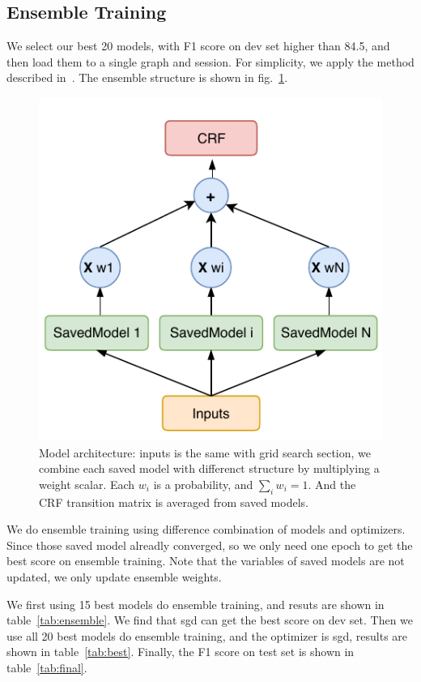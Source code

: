 \documentclass{article}
\begin{document}
\subsection{Ensemble Training}
We select our best 20 models, with F1 score on dev set higher than 84.5, and then load them to a single graph and session.
For simplicity, we apply the method described in~\cite{ensemble}. The ensemble structure is shown in fig.~\ref{fig:ensemble}.

\begin{figure}[tbh]
    \centering
    \includegraphics{ensemble_crf}
    \caption{Model architecture: inputs is the same with grid search section, we combine each saved model with differenct structure by multiplying a weight scalar. Each $w_i$ is a probability, and $\sum_i w_i = 1$. And the CRF transition matrix is averaged from saved models.}
    \label{fig:ensemble}
\end{figure}

We do ensemble training using difference combination of models and optimizers.
Since those saved model alreadly converged, so we only need one epoch to get the best score on ensemble training.
Note that the variables of saved models are not updated, we only update ensemble weights.

We first using 15 best models do ensemble training, and resuts are shown in table~\ref{tab:ensemble}.
We find that sgd can get the best score on dev set. Then we use all 20 best models do ensemble training, and the optimizer is sgd,
results are shown in table~\ref{tab:best}.
Finally, the F1 score on test set is shown in table~\ref{tab:final}.
\end{document}
